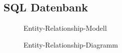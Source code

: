 \subsection{SQL Datenbank}
\begin{landscape}
\begin{figure}
  \centering
  \caption{Entity-Relationship-Modell\label{fig:rm}}
\end{figure}
\end{landscape}


\begin{landscape}
\begin{figure}
  \centering
  \caption{Entity-Relationship-Diagramm\label{fig:erm}}
\end{figure}
\end{landscape}


